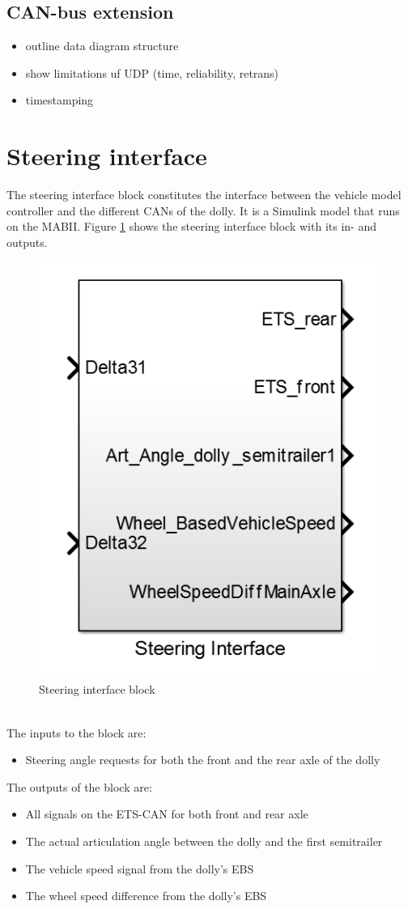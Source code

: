 \documentclass[ExampleMasters.tex]{subfiles}
\begin{document}
\subsection{CAN-bus extension}
\label{sec:can_bus_extension_software}

\begin{itemize}
	\item outline data diagram structure
	\item show limitations uf UDP (time, reliability, retrans)
	\item timestamping
	
	
\end{itemize}
\section{Steering interface}
\label{sec:steering_interface}
The steering interface block constitutes the interface between the vehicle model controller and the different CANs of the dolly. It is a Simulink model that runs on the MABII.
Figure \ref{fig:steering_interface} shows the steering interface block with its in- and outputs. 
\begin{figure}[h]
	\centering
	\includegraphics[width=0.5\linewidth]{figures/steering_interface}
	
	\caption{Steering interface block}
	\label{fig:steering_interface}
\end{figure} \\
The inputs to the block are:
\begin{itemize}
	\item Steering angle requests for both the front and  the rear axle of the dolly 
\end{itemize} 
 The outputs of the block are:
 \begin{itemize}
 	\item All signals on the ETS-CAN for both front and rear axle
 	\item The actual articulation angle between the dolly and the first semitrailer
 	\item The vehicle speed signal from the dolly's EBS
 	\item The wheel speed difference from the dolly's EBS
 \end{itemize}
\end{document}
